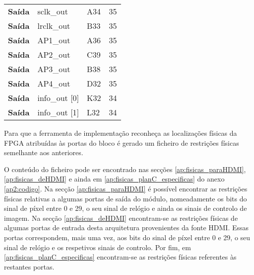 \begin{table}[h!]
\begin{tabular}{rlll}
		\multicolumn{1}{r|}{\textbf{Saída}}   & sclk\_out                             & A34                                      & 35                                         \\
		\multicolumn{1}{r|}{\textbf{Saída}}   & lrclk\_out                            & B33                                      & 35                                         \\
		\multicolumn{1}{r|}{\textbf{Saída}}   & AP1\_out                              & A36                                      & 35                                         \\
		\multicolumn{1}{r|}{\textbf{Saída}}   & AP2\_out                              & C39                                      & 35                                         \\
		\multicolumn{1}{r|}{\textbf{Saída}}   & AP3\_out                              & B38                                      & 35                                         \\
		\multicolumn{1}{r|}{\textbf{Saída}}   & AP4\_out                              & D32                                      & 35                                         \\
		\multicolumn{1}{r|}{\textbf{Saída}}   & info\_out {[}0{]}                     & K32                                      & 34                                         \\
		\multicolumn{1}{r|}{\textbf{Saída}}   & info\_out {[}1{]}                     & L32                                      & 34                                         \\ \hline
	\end{tabular}
\end{table}


Para que a ferramenta de implementação reconheça as localizações físicas da FPGA atribuídas às portas do bloco é gerado um ficheiro de restrições físicas semelhante aos anteriores.

O conteúdo do ficheiro pode ser encontrado nas secções \ref{ap:fisicas_paraHDMI}, \ref{ap:fisicas_deHDMI} e ainda em \ref{ap:fisicas_planC_especificas} do anexo \ref{ap2:codigo}. Na secção \ref{ap:fisicas_paraHDMI} é possível encontrar as restrições físicas relativas a algumas portas de saída do módulo, nomeadamente os bits do sinal de píxel entre 0 e 29, o seu sinal de relógio e ainda os sinais de controlo de imagem. Na secção \ref{ap:fisicas_deHDMI} encontram-se as restrições físicas de algumas portas de entrada desta arquitetura provenientes da fonte HDMI. Essas portas correspondem, mais uma vez, aos bits do sinal de píxel entre 0 e 29, o seu sinal de relógio e os respetivos sinais de controlo. Por fim, em \ref{ap:fisicas_planC_especificas} encontram-se as restrições físicas referentes às restantes portas.


